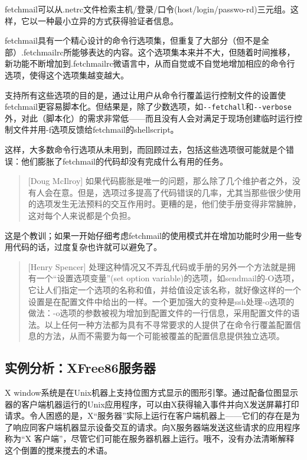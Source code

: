 \documentclass[12pt,oneside]{ctexbook}
\begin{document}
\begin{common-format}
fetchmail可以从.netrc文件检索主机/登录/口令(host/login/passwo-rd)三元组。这样，它以一种最小立异的方式获得验证者信息。

fetchmail具有一个精心设计的命令行选项集，但重复了大部分（但不是全部）.fetchmailrc所能够表达的内容。这个选项集本来并不大，但随着时间推移，新功能不断增加到.fetchmailrc微语言中，从而自觉或不自觉地增加相应的命令行选项，使得这个选项集越变越大。

支持所有这些选项的目的是，通过让用户从命令行覆盖运行控制文件的设置使fetchmail更容易脚本化。但结果是，除了少数选项，如\verb+--fetchall+和\verb+--verbose+外，对此（脚本化）的需求非常低——而且没有人会对满足于现场创建临时运行控制文件并用-f选项反馈给fetchmail的shellscript。

这样，大多数命令行选项从未用到，而回顾过去，包括这些选项很可能就是个错误：他们膨胀了fetchmail的代码却没有完成什么有用的任务。

\begin{quote}[Doug McIlroy]
如果代码膨胀是唯一的问题，那么除了几个维护者之外，没有人会在意。但是，选项过多提高了代码错误的几率，尤其当那些很少使用的选项发生无法预料的交互作用时。更糟的是，他们使手册变得非常臃肿，这对每个人来说都是个负担。
\end{quote}

这是个教训；如果一开始仔细考虑fetchmail的使用模式并在增加功能时少用一些专用代码的话，过度复杂也许就可以避免了。

\begin{quote}[Henry Spencer]
处理这种情况又不弄乱代码或手册的另外一个方法就是拥有一个“设置选项变量”(set option variable)的选项，如sendmail的-O选项，它让人们指定一个选项的名称和值，并给值设定该名称，就好像这样的一个设置是在配置文件中给出的一样。一个更加强大的变种是ssh处理-o选项的做法：-o选项的参数被视为增加到配置文件的一行信息，采用配置文件的语法。以上任何一种方法都为具有不寻常要求的人提供了在命令行覆盖配置信息的方法，从而不需要为每一个可能被覆盖的配置信息提供独立选项。
\end{quote}


\subsection{实例分析：XFree86服务器}
X window系统是在Unix机器上支持位图方式显示的图形引擎。通过配备位图显示器的客户端机器运行的Unix应用程序，可以由X获得输入事件并向X发送屏幕打印请求。令人困惑的是，X“服务器”实际上运行在客户端机器上——它们的存在是为了响应同客户端机器显示设备交互的请求。向X服务器端发送这些请求的应用程序称为“X
客户端”，尽管它们可能在服务器机器上运行。哦不，没有办法清晰解释这个倒置的搅来搅去的术语。


\end{common-format}
\end{document}
